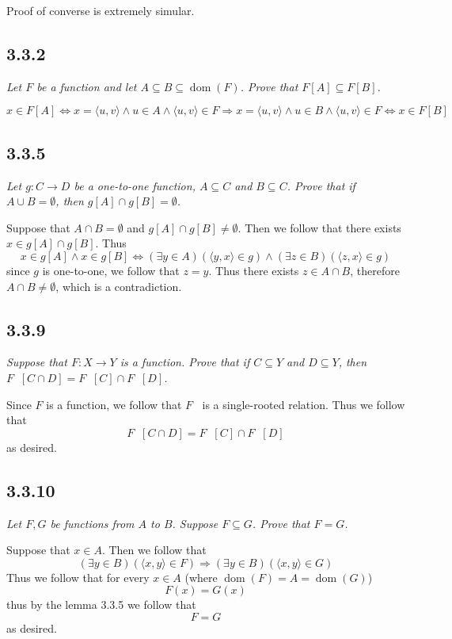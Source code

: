 \documentclass[11pt,oneside,titlepage]{book}
\DeclareMathOperator \inv {^{-1}}
\DeclareMathOperator \lra {\Leftrightarrow}
\DeclareMathOperator \ra {\Rightarrow}
\DeclareMathOperator \dom {dom}
\newcommand{\eangle}[1]{\langle #1 \rangle}
\begin{document}
Proof of converse is extremely simular.

\subsection*{3.3.2}

\textit{Let $F$ be a function and let $A \subseteq B \subseteq \dom(F)$. Prove that
  $F[A] \subseteq F[B]$.}

$$x \in F[A] \lra x = \eangle{u, v} \land u \in A \land \eangle{u, v} \in F \ra
x = \eangle{u, v} \land u \in B \land \eangle{u, v} \in F \lra x \in F[B]$$

\subsection*{3.3.5}

\textit{Let $g: C \to D$ be a one-to-one function, $A \subseteq C$ and $B \subseteq C$. Prove
  that if $A \cup B = \emptyset$, then $g[A] \cap g[B] = \emptyset$.}

Suppose that $A \cap B = \emptyset$ and $g[A] \cap g[B] \neq \emptyset$. Then we follow that
there exists $x \in g[A] \cap g[B]$. Thus
$$x \in g[A] \land x \in g[B] \lra (\exists y \in A)(\eangle{y, x} \in g) \land
(\exists z \in B)(\eangle{z, x} \in g)$$
since $g$ is one-to-one, we follow that $z = y$. Thus there exists $z \in A \cap B$, therefore
$A \cap B \neq \emptyset$, which is a contradiction.

\subsection*{3.3.9}

\textit{Suppose that $F: X \to Y$ is a function. Prove that if $C \subseteq Y$ and
  $D \subseteq Y$, then $F\inv[C \cap D] = F\inv[C] \cap F\inv[D]$.}

Since $F$ is a function, we follow that $F\inv$ is a single-rooted relation. Thus we follow that
$$F\inv[C \cap D] = F\inv[C] \cap F\inv[D]$$
as desired.

\subsection*{3.3.10}

\textit{Let $F, G$ be functions from $A$ to $B$. Suppose $F \subseteq G$. Prove that $F = G$.}

Suppose that $x \in A$. Then we follow that
$$(\exists y \in B)(\eangle{x, y} \in F) \ra (\exists y \in B)(\eangle{x, y} \in G)$$
Thus we follow that for every $x \in A$ (where $\dom (F) = A = \dom(G)$)
$$F(x) = G(x)$$
thus by the lemma 3.3.5 we follow that
$$F = G$$
as desired.
\end{document}
